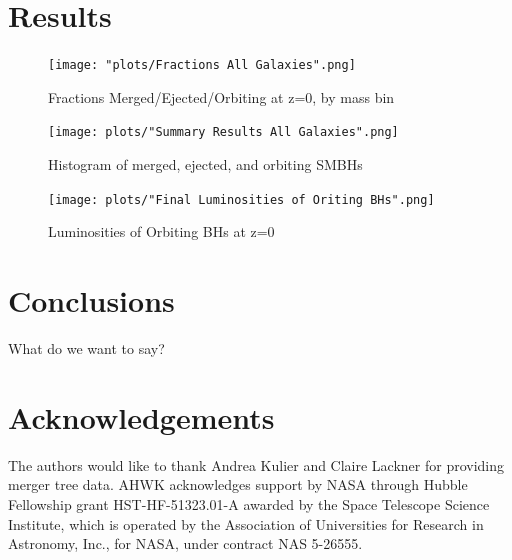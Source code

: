 \documentclass[english, apj]{emulateapj}
\begin{document}
\section{Results}\label{sec:results}
\begin{figure}[ht]
\begin{center}
\texttt{[image: "plots/Fractions All Galaxies".png]}
\caption{Fractions Merged/Ejected/Orbiting at z=0, by mass bin}
\label{fig:fmeo}
\end{center}
\end{figure}

\begin{figure}[ht]
\begin{center}
\texttt{[image: plots/"Summary Results All Galaxies".png]}
\caption{Histogram of merged, ejected, and orbiting SMBHs}
\label{fig:meosmbh}
\end{center}
\end{figure}

\begin{figure}[ht]
\begin{center}
\texttt{[image: plots/"Final Luminosities of Oriting BHs".png]}
\caption{Luminosities of Orbiting BHs at z=0}
\label{fig:loobhs}
\end{center}
\end{figure}

\section{Conclusions}\label{sec:conclusions}
What do we want to say?



\section*{Acknowledgements}

The authors would like to thank Andrea Kulier and Claire Lackner for providing merger tree data. AHWK acknowledges support by NASA through Hubble Fellowship grant HST-HF-51323.01-A awarded by the Space Telescope Science Institute, which is operated by the Association of Universities for Research in Astronomy, Inc., for NASA, under contract NAS 5-26555. 








\end{document}
